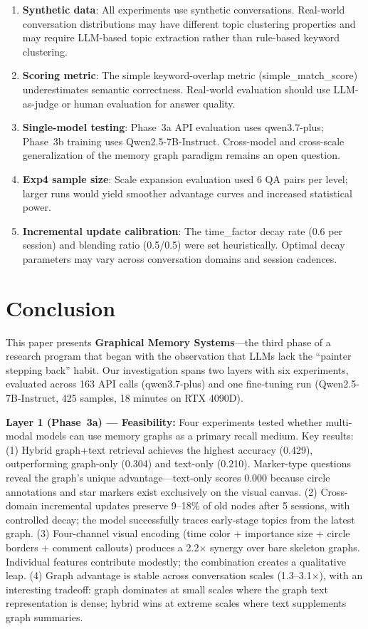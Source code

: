 \documentclass[11pt,a4paper]{article}
\begin{document}
\begin{enumerate}[nosep]
\item \textbf{Synthetic data}: All experiments use synthetic conversations. Real-world conversation distributions may have different topic clustering properties and may require LLM-based topic extraction rather than rule-based keyword clustering.
\item \textbf{Scoring metric}: The simple keyword-overlap metric (simple\_match\_score) underestimates semantic correctness. Real-world evaluation should use LLM-as-judge or human evaluation for answer quality.
\item \textbf{Single-model testing}: Phase~3a API evaluation uses qwen3.7-plus; Phase~3b training uses Qwen2.5-7B-Instruct. Cross-model and cross-scale generalization of the memory graph paradigm remains an open question.
\item \textbf{Exp4 sample size}: Scale expansion evaluation used 6 QA pairs per level; larger runs would yield smoother advantage curves and increased statistical power.
\item \textbf{Incremental update calibration}: The time\_factor decay rate (0.6 per session) and blending ratio (0.5/0.5) were set heuristically. Optimal decay parameters may vary across conversation domains and session cadences.
\end{enumerate}


\section{Conclusion}

This paper presents \textbf{Graphical Memory Systems}---the third phase of a research program that began with the observation that LLMs lack the ``painter stepping back'' habit. Our investigation spans two layers with six experiments, evaluated across 163 API calls (qwen3.7-plus) and one fine-tuning run (Qwen2.5-7B-Instruct, 425 samples, 18 minutes on RTX 4090D).

\textbf{Layer 1 (Phase~3a) — Feasibility:} Four experiments tested whether multi-modal models can use memory graphs as a primary recall medium. Key results: (1) Hybrid graph+text retrieval achieves the highest accuracy (0.429), outperforming graph-only (0.304) and text-only (0.210). Marker-type questions reveal the graph's unique advantage---text-only scores 0.000 because circle annotations and star markers exist exclusively on the visual canvas. (2) Cross-domain incremental updates preserve 9--18\% of old nodes after 5 sessions, with controlled decay; the model successfully traces early-stage topics from the latest graph. (3) Four-channel visual encoding (time color + importance size + circle borders + comment callouts) produces a 2.2$\times$ synergy over bare skeleton graphs. Individual features contribute modestly; the combination creates a qualitative leap. (4) Graph advantage is stable across conversation scales (1.3--3.1$\times$), with an interesting tradeoff: graph dominates at small scales where the graph text representation is dense; hybrid wins at extreme scales where text supplements graph summaries.
\end{document}
